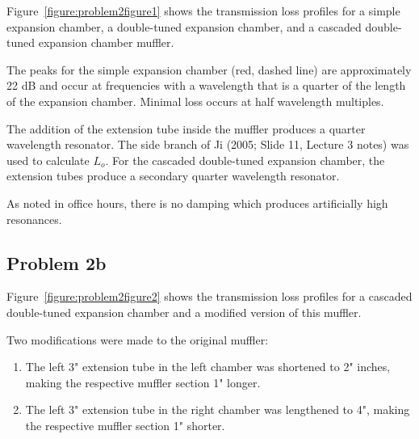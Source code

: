 \vspace{0.25cm}
Figure~\ref{figure:problem2figure1} shows the transmission loss profiles for a simple expansion chamber, a double-tuned expansion chamber, and a cascaded double-tuned expansion chamber muffler.

\vspace{0.25cm}
The peaks for the simple expansion chamber (red, dashed line) are approximately 22 dB and occur at frequencies with a wavelength that is a quarter of the length of the expansion chamber.  Minimal loss occurs at half wavelength multiples.

\vspace{0.25cm}
The addition of the extension tube inside the muffler produces a quarter wavelength resonator.  The side branch of Ji (2005;  Slide 11, Lecture 3 notes) was used to calculate $L_o$.  For the cascaded double-tuned expansion chamber, the extension tubes produce a secondary quarter wavelength resonator.

\vspace{0.25cm}
As noted in office hours, there is no damping which produces artificially high resonances.


%
%
%



\subsection*{Problem 2b}

Figure~\ref{figure:problem2figure2} shows the transmission loss profiles for a cascaded double-tuned expansion chamber and a modified version of this muffler.

\vspace{0.25cm}
Two modifications were made to the original muffler:

\begin{enumerate}[itemsep=0.3cm]
  \item The left 3" extension tube in the left chamber was shortened to 2" inches, making the respective muffler section 1" longer.
  \item The left 3" extension tube in the right chamber was lengthened to 4", making the respective muffler section 1" shorter.
\end{enumerate}

